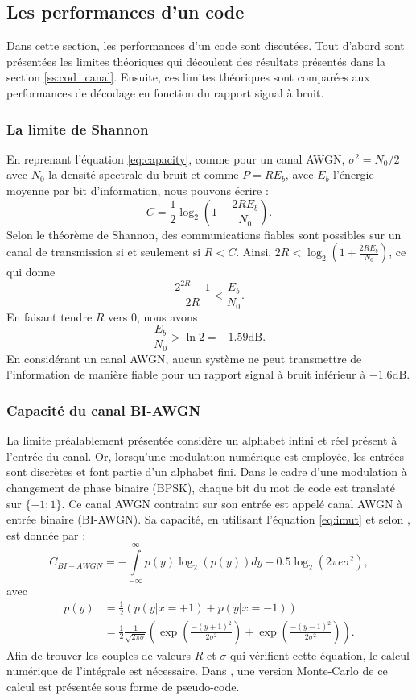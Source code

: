 \subsection{Les performances d'un code}
Dans cette section, les performances d'un code sont discutées. Tout d'abord sont présentées les limites théoriques qui 
découlent des résultats présentés dans la section \ref{ss:cod_canal}. Ensuite, ces limites théoriques sont comparées aux 
performances de décodage en fonction du rapport signal à bruit.
\subsubsection{La limite de Shannon}
En reprenant l'équation \ref{eq:capacity}, comme pour un canal AWGN, $\sigma^2 = N_0/2$ avec $N_0$ la densité spectrale du bruit et comme 
$P=R E_b$, avec $E_b$ l'énergie moyenne par bit d'information, nous pouvons écrire :
\[C=\frac{1}{2}\log_2(1+\frac{2RE_b}{N_0}).\]
Selon le théorème de Shannon, des communications fiables sont possibles sur un canal de transmission si et seulement si $R < C$. Ainsi,
$2R < \log_2\left(1+\frac{2RE_b}{N_0}\right)$, ce qui donne 
\begin{equation}\label{eq:shlimit}
	\frac{2^{2R}-1}{2R}<\frac{E_b}{N_0}.
\end{equation}
En faisant tendre $R$ vers $0$, nous avons \[\frac{E_b}{N_0}>\ln 2 = -1.59 \text{dB}.\]
En considérant un canal AWGN, aucun système ne peut transmettre de l'information de manière fiable pour un rapport 
signal à bruit inférieur à $-1.6\text{dB}.$

\subsubsection{Capacité du canal BI-AWGN}
La limite préalablement présentée considère un alphabet infini et réel présent à l'entrée du canal. Or, lorsqu'une 
modulation numérique est employée, les entrées sont discrètes et font partie d'un alphabet fini. Dans le cadre d'une 
modulation à changement de phase binaire (BPSK), chaque bit du mot de code est translaté sur $\{-1;1\}$. Ce canal AWGN 
contraint sur son entrée est appelé canal AWGN à entrée binaire (BI-AWGN). Sa capacité, en utilisant l'équation 
\ref{eq:imut} et selon \cite[Chapitre 8]{ryan}, est donnée par : 
\begin{equation}\label{eq:softlimit}
	C_{BI-AWGN} = - \int\limits_{-\infty}^{\infty} p(y) \log_2\left(p(y)\right)dy - 0.5\log_2\left(2\pi e \sigma^2\right),
\end{equation}
avec 
\begin{align*}
	p(y) & = \frac{1}{2} \left(p(y|x=+1)+p(y|x=-1)\right)                                                    \\
	     & = \frac{1}{2} \frac{1}{\sqrt{2\pi \sigma}} \left( \exp \left(\frac{-(y+1)^2}{2\sigma ^2}\right) + 
	\exp \left(\frac{-(y-1)^2}{2\sigma ^2}\right)\right).
\end{align*}
Afin de trouver les couples de valeurs $R$ et $\sigma$ qui vérifient cette équation, le calcul numérique de l'intégrale 
est nécessaire. Dans \cite{johnson2009iterative}, une version Monte-Carlo de ce calcul est présentée sous forme de pseudo-code.

